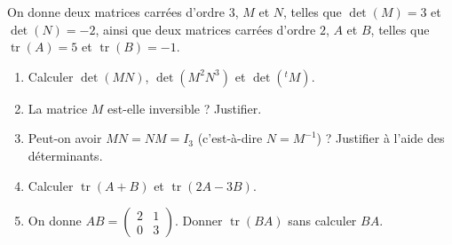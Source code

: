 On donne deux matrices carrées d'ordre $3$, $M$ et $N$, telles que
$\det(M) = 3$ et $\det(N) = -2$, ainsi que deux matrices carrées d'ordre $2$,
$A$ et $B$, telles que $\operatorname{tr}(A) = 5$ et $\operatorname{tr}(B) = -1$.
\begin{enumerate}
	\item Calculer $\det(MN)$, $\det(M^2 N^3)$ et $\det({}^{t}\!M)$.
	\item La matrice $M$ est-elle inversible ? Justifier.
	\item Peut-on avoir $MN = NM = I_3$ (c'est-à-dire $N = M^{-1}$) ? Justifier
	à l'aide des déterminants.
	\item Calculer $\operatorname{tr}(A + B)$ et $\operatorname{tr}(2A - 3B)$.
	\item On donne $AB = \begin{pmatrix}2&1\\0&3\end{pmatrix}$. Donner
	$\operatorname{tr}(BA)$ sans calculer $BA$.
\end{enumerate}
